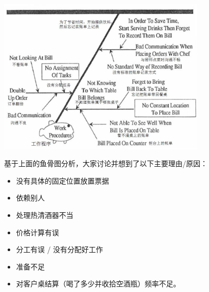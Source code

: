 
\includegraphics[width=10cm]{club151.jpg}

基于上面的鱼骨图分析，大家讨论并想到了以下主要理由/原因：

\begin{itemize}
\tightlist
\item
  没有具体的固定位置放置票据
\end{itemize}

\begin{itemize}
\tightlist
\item
  依赖别人
\end{itemize}

\begin{itemize}
\tightlist
\item
  处理热清酒器不当
\end{itemize}

\begin{itemize}
\tightlist
\item
  价格计算有误
\end{itemize}

\begin{itemize}
\tightlist
\item
  分工有误 / 没有分配好工作
\end{itemize}

\begin{itemize}
\tightlist
\item
  准备不足
\end{itemize}

\begin{itemize}
\tightlist
\item
  对客户桌结算（喝了多少并收拾空酒瓶）频率不足。
\end{itemize}


